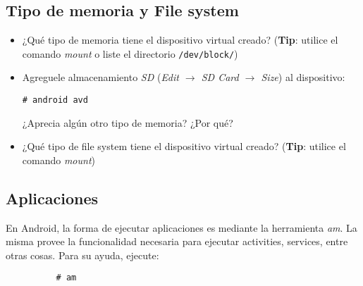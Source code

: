\subsection{Tipo de memoria y File system}
\begin{itemize}
    \item ¿Qué tipo de memoria tiene el dispositivo virtual creado? (\textbf{Tip}: utilice el comando \textit{mount} o liste el directorio \texttt{/dev/block/})
    
    \item Agreguele almacenamiento \textit{SD} (\emph{Edit $\rightarrow$ SD Card $\rightarrow$ Size}) al dispositivo:
    \begin{lstlisting}
# android avd
    \end{lstlisting}
    ¿Aprecia algún otro tipo de memoria? ¿Por qué?   
    
    \item ¿Qué tipo de file system tiene el dispositivo virtual creado? (\textbf{Tip}: utilice el comando \textit{mount})      
\end{itemize}

\subsection{Aplicaciones}
En Android, la forma de ejecutar aplicaciones es mediante la herramienta \textit{am}. La misma provee la funcionalidad necesaria para ejecutar activities, services, entre otras cosas.
Para su ayuda, ejecute:
\begin{lstlisting}
          # am
\end{lstlisting}

